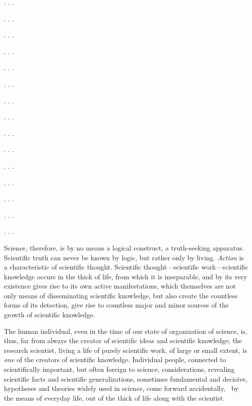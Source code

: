 \Section %

. . .

\Section %

. . .

\Section %

. . .

\Section %

. . .

\Section %

. . .

\Section %

. . .

\Section %

. . .

\Section %

. . .

\Section %

. . .

\Section %

. . .

\Section %

. . .

\Section %

. . .

\Section %

. . .

\Section %

. . .

\Section %

. . .

\Section %
Science, therefore, is by no means a logical construct, a truth-seeking
apparatus.  Scientific truth can never be known by logic, but rather only by
living.  \emph{Action }is a characteristic of scientific thought.  Scientific
thought---scientific work---scientific knowledge occurs in the thick of life,
from which it is inseparable, and by its very existence gives rise to its own
active manifestations, which themselves are not only means of disseminating
scientific knowledge, but also create the countless forms of its detection,
give rise to countless major and minor sources of the growth of scientific
knowledge.

The human individual, even in the time of our state of organization of science,
is, thus, far from always the creator of scientific ideas and scientific
knowledge; the research scientist, living a life of purely scientific work, of
large or small extent, is \emph{one} of the creators of scientific knowledge.
Individual people, connected to scientifically important, but often foreign to
science, considerations, revealing scientific facts and scientific
generalizations, sometimes fundamental and decisive, hypotheses and theories
widely used in science, come forward accidentally, \ie\ by the means of
everyday life, out of the thick of life along with the scientist.

